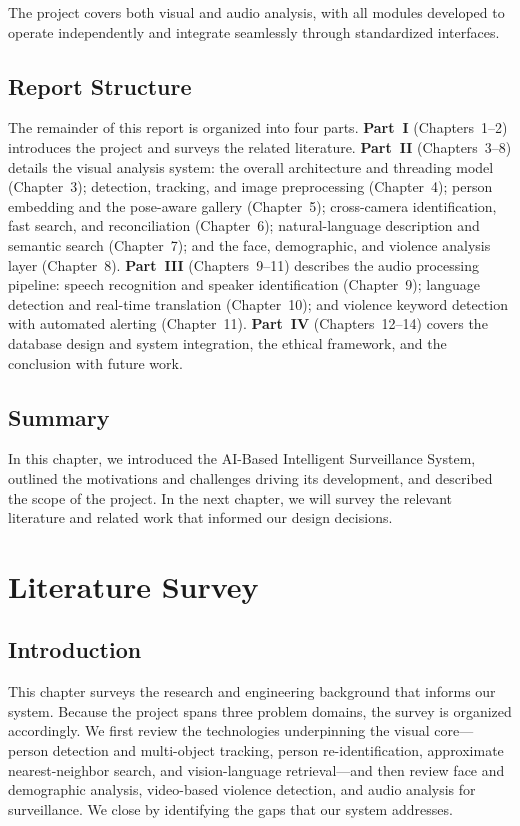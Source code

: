 \documentclass[12pt]{report}
\begin{document}
\noindent The project covers both visual and audio analysis, with all modules developed to operate independently and integrate seamlessly through standardized interfaces.

\section{Report Structure}
The remainder of this report is organized into four parts. \textbf{Part~I} (Chapters~1--2) introduces the project and surveys the related literature. \textbf{Part~II} (Chapters~3--8) details the visual analysis system: the overall architecture and threading model (Chapter~3); detection, tracking, and image preprocessing (Chapter~4); person embedding and the pose-aware gallery (Chapter~5); cross-camera identification, fast search, and reconciliation (Chapter~6); natural-language description and semantic search (Chapter~7); and the face, demographic, and violence analysis layer (Chapter~8). \textbf{Part~III} (Chapters~9--11) describes the audio processing pipeline: speech recognition and speaker identification (Chapter~9); language detection and real-time translation (Chapter~10); and violence keyword detection with automated alerting (Chapter~11). \textbf{Part~IV} (Chapters~12--14) covers the database design and system integration, the ethical framework, and the conclusion with future work.

\section{Summary}
In this chapter, we introduced the AI-Based Intelligent Surveillance System, outlined the motivations and challenges driving its development, and described the scope of the project. In the next chapter, we will survey the relevant literature and related work that informed our design decisions.

\newpage

\chapter{Literature Survey}
\setcounter{section}{0}

\section{Introduction}
This chapter surveys the research and engineering background that informs our system. Because the project spans three problem domains, the survey is organized accordingly. We first review the technologies underpinning the visual core---person detection and multi-object tracking, person re-identification, approximate nearest-neighbor search, and vision-language retrieval---and then review face and demographic analysis, video-based violence detection, and audio analysis for surveillance. We close by identifying the gaps that our system addresses.
\end{document}
